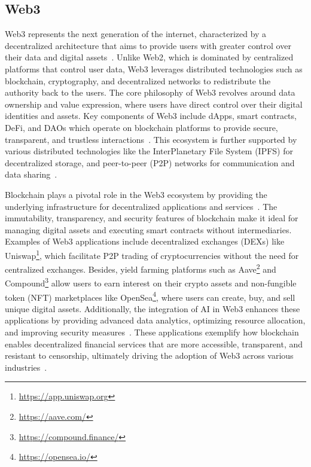 \documentclass[5p,twocolumn]{elsarticle}
\begin{document}
\subsection{Web3}
Web3 represents the next generation of the internet, characterized by a decentralized architecture that aims to provide users with greater control over their data and digital assets~\cite{liu2023web3,huang2023overview}. Unlike Web2, which is dominated by centralized platforms that control user data, Web3 leverages distributed technologies such as blockchain, cryptography, and decentralized networks to redistribute the authority back to the users. The core philosophy of Web3 revolves around data ownership and value expression, where users have direct control over their digital identities and assets. Key components of Web3 include dApps, smart contracts, DeFi, and DAOs which operate on blockchain platforms to provide secure, transparent, and trustless interactions~\cite{qin2023web3based}. This ecosystem is further supported by various distributed technologies like the InterPlanetary File System (IPFS) for decentralized storage, and peer-to-peer (P2P) networks for communication and data sharing~\cite{kim2023moving,tariq2025blockchain}.

Blockchain plays a pivotal role in the Web3 ecosystem by providing the underlying infrastructure for decentralized applications and services~\cite{li2024blockchain}. The immutability, transparency, and security features of blockchain make it ideal for managing digital assets and executing smart contracts without intermediaries. Examples of Web3 applications include decentralized exchanges (DEXs) like Uniswap\footnote{\url{https://app.uniswap.org}}, which facilitate P2P trading of cryptocurrencies without the need for centralized exchanges. Besides, yield farming platforms such as Aave\footnote{\url{https://aave.com/}} and Compound\footnote{\url{https://compound.finance/}} allow users to earn interest on their crypto assets and non-fungible token (NFT) marketplaces like OpenSea\footnote{\url{https://opensea.io/}}, where users can create, buy, and sell unique digital assets. Additionally, the integration of AI in Web3 enhances these applications by providing advanced data analytics, optimizing resource allocation, and improving security measures~\cite{shen2024artificial}. These applications exemplify how blockchain enables decentralized financial services that are more accessible, transparent, and resistant to censorship, ultimately driving the adoption of Web3 across various industries~\cite{li2024blockchain}.
\end{document}
